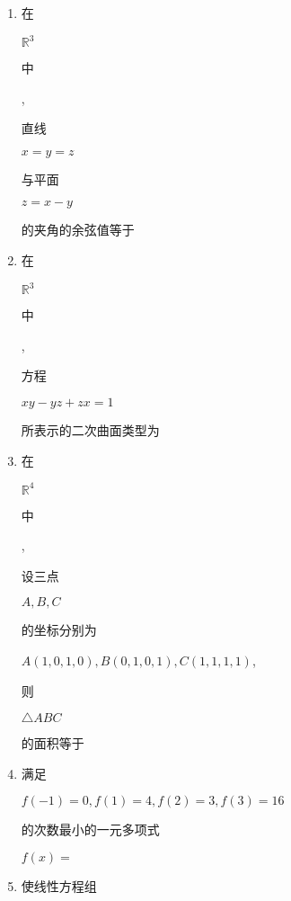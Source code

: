 \documentclass[10pt]{article}
\begin{document}
\begin{enumerate}
  \item \begin{CJK}{UTF8}{mj}在\end{CJK} $\mathbb{R}^{3}$ \begin{CJK}{UTF8}{mj}中\end{CJK}, \begin{CJK}{UTF8}{mj}直线\end{CJK} $x=y=z$ \begin{CJK}{UTF8}{mj}与平面\end{CJK} $z=x-y$ \begin{CJK}{UTF8}{mj}的夹角的余弦值等于\end{CJK}

  \item \begin{CJK}{UTF8}{mj}在\end{CJK} $\mathbb{R}^{3}$ \begin{CJK}{UTF8}{mj}中\end{CJK}, \begin{CJK}{UTF8}{mj}方程\end{CJK} $x y-y z+z x=1$ \begin{CJK}{UTF8}{mj}所表示的二次曲面类型为\end{CJK}

  \item \begin{CJK}{UTF8}{mj}在\end{CJK} $\mathbb{R}^{4}$ \begin{CJK}{UTF8}{mj}中\end{CJK}, \begin{CJK}{UTF8}{mj}设三点\end{CJK} $A, B, C$ \begin{CJK}{UTF8}{mj}的坐标分别为\end{CJK} $A(1,0,1,0), B(0,1,0,1), C(1,1,1,1)$, \begin{CJK}{UTF8}{mj}则\end{CJK} $\triangle A B C$ \begin{CJK}{UTF8}{mj}的面积等于\end{CJK}

  \item \begin{CJK}{UTF8}{mj}满足\end{CJK} $f(-1)=0, f(1)=4, f(2)=3, f(3)=16$ \begin{CJK}{UTF8}{mj}的次数最小的一元多项式\end{CJK} $f(x)=$

  \item \begin{CJK}{UTF8}{mj}使线性方程组\end{CJK}

\end{enumerate}
\end{document}

